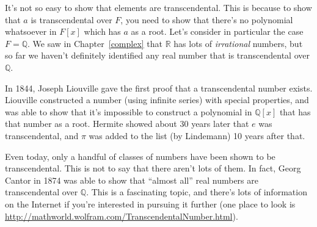 \begin{rem}\label{remark:poly:transcendental}
It's not so easy to show that elements are transcendental. This is because to show that $a$ is transcendental over $F$, you need to show that there's no polynomial whatsoever in $F[x]$  which has $a$ as a root. Let's consider in particular the case $F = \mathbb{Q}$. We saw in Chapter~\ref{complex} that $\mathbb{R}$ has lots of \emph{irrational} numbers, but so far we haven't definitely identified any real number that is transcendental over $\mathbb{Q}$. 

In 1844, Joseph Liouville gave the first proof that a transcendental number exists.  Liouville constructed a number (using infinite series) with special properties, and was able to show that it's impossible to construct a polynomial in $\mathbb{Q}[x]$ that has that number as a root. Hermite showed about 30 years later that $e$ was transcendental, and $\pi$ was added to the list (by Lindemann) 10 years after that. 

Even today, only  a handful of classes of numbers have been shown to be transcendental. This is not to say that there aren't lots of them. In fact, Georg Cantor in 1874 was able to show that ``almost all'' real numbers are transcendental over $\mathbb{Q}$. This is a fascinating topic, and there's lots of information on the Internet if you're interested in pursuing it further (one place to look is 
\url{http://mathworld.wolfram.com/TranscendentalNumber.html}).
\end{rem}


